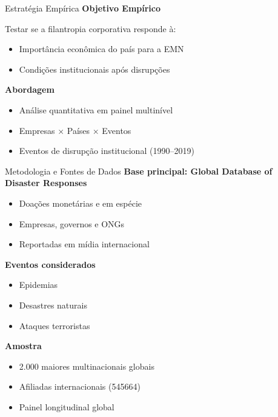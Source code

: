 \documentclass[
  10pt,
  ignorenonframetext,
  aspectratio=169,
  brazilian,
]{beamer}
\providecommand{\tightlist}{%
  \setlength{\itemsep}{0pt}\setlength{\parskip}{0pt}}
\begin{document}
\begin{frame}{Estratégia Empírica}
\label{estratuxe9gia-empuxedrica}
\textbf{Objetivo Empírico}

Testar se a filantropia corporativa responde à:

\begin{itemize}
\tightlist
\item
  Importância econômica do país para a EMN
\item
  Condições institucionais após disrupções
\end{itemize}

\textbf{Abordagem}

\begin{itemize}
\tightlist
\item
  Análise quantitativa em painel multinível
\item
  Empresas \(\times\) Países \(\times\) Eventos
\item
  Eventos de disrupção institucional (1990--2019)
\end{itemize}
\end{frame}

\begin{frame}{Metodologia e Fontes de Dados}
\label{metodologia-e-fontes-de-dados}
\textbf{Base principal: Global Database of Disaster Responses}

\begin{itemize}
\tightlist
\item
  Doações monetárias e em espécie
\item
  Empresas, governos e ONGs
\item
  Reportadas em mídia internacional
\end{itemize}

\textbf{Eventos considerados}

\begin{itemize}
\tightlist
\item
  Epidemias
\item
  Desastres naturais
\item
  Ataques terroristas
\end{itemize}

\textbf{Amostra}

\begin{itemize}
\tightlist
\item
  2.000 maiores multinacionais globais
\item
  Afiliadas internacionais (545664)
\item
  Painel longitudinal global
\end{itemize}
\end{frame}
\end{document}
